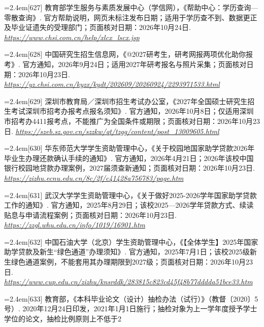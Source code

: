 {\par\noindent\hangindent=2.4em\label{src:S0773}{\color{cAccent}[627]} 教育部学生服务与素质发展中心（学信网），《帮助中心：学历查询—零散查询》. 官方帮助说明，网页未标注发布日期；适用于学历查不到、数据更正及毕业证遗失的受理部门；页面核对日期：2026年10月24日. \textit{\url{https://www.chsi.com.cn/help/xlcx_lscx.jsp}}\par
\par\noindent\hangindent=2.4em\label{src:S0774}{\color{cAccent}[628]} 中国研究生招生信息网，《@2027研考生，研考网报两项优化助你报考》. 官方通知，2026年9月24日；适用2027年研考报名与照片采集；页面核对日期：2026年10月23日. \textit{\url{https://yz.chsi.com.cn/kyzx/kydt/202609/20260924/2293971533.html}}\par
\par\noindent\hangindent=2.4em\label{src:S0775}{\color{cAccent}[629]} 深圳市教育局／深圳市招生考试办公室，《2027年全国硕士研究生招生考试深圳市招考办报考点报名须知》. 官方通知，2026年10月8日；仅适用深圳市招考办4411报考点，不能推广为全国条件或期限；页面核对日期：2026年10月23日. \textit{\url{https://szeb.sz.gov.cn/szzkw/qt/tzgg/content/post_13009605.html}}\par
\par\noindent\hangindent=2.4em\label{src:S0776}{\color{cAccent}[630]} 华东师范大学学生资助管理中心，《关于校园地国家助学贷款2026年毕业生办理还款确认手续的通知》. 官方通知，2026年4月21日；2026年该校中国银行校园地贷款办理案例，2027届须查新通知；页面核对日期：2026年10月23日. \textit{\url{https://zizhu.ecnu.edu.cn/8c/2f/c41428a756783/page.htm}}\par
\par\noindent\hangindent=2.4em\label{src:S0777}{\color{cAccent}[631]} 武汉大学学生资助管理中心，《关于做好2025-2026学年国家助学贷款工作的通知》. 官方通知，2025年8月29日；该校2025—2026学年贷款方式、续读贴息与申请流程案例；页面核对日期：2026年10月23日. \textit{\url{https://zzgl.whu.edu.cn/info/1019/16901.htm}}\par
\par\noindent\hangindent=2.4em\label{src:S0778}{\color{cAccent}[632]} 中国石油大学（北京）学生资助管理中心，《【全体学生】2025年国家助学贷款及新生“绿色通道”办理须知》. 官方通知，2025年7月1日；该校2025级新生绿色通道案例，不能套用其办理期限到2027级；页面核对日期：2026年10月23日. \textit{\url{https://www.cup.edu.cn/zizhu/knsrddk/283815c823cd45f48b77dddda51bce33.htm}}\par
}
\par\noindent\hangindent=2.4em\label{src:S0779}{\color{cAccent}[633]} 教育部，《本科毕业论文（设计）抽检办法（试行）》（教督〔2020〕5号）. 2020年12月24日印发，2021年1月1日施行；抽检对象为上一学年度授予学士学位的论文，抽检比例原则上不低于2%
